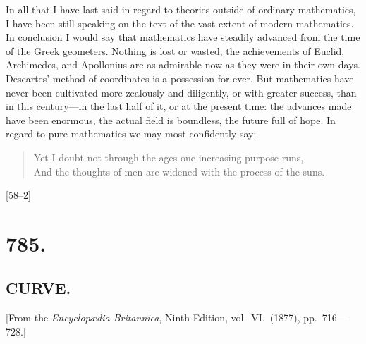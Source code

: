 \documentclass[12pt,a4paper,oneside]{book}
\newcommand{\paperref}[1]{\par\noindent\hfill[#1]\hfill\null\par}
\begin{document}
In all that I have last said in regard to theories outside of ordinary mathematics, I have been still speaking on the text of the vast extent of modern mathematics. In conclusion I would say that mathematics have steadily advanced from the time of the Greek geometers. Nothing is lost or wasted; the achievements of Euclid, Archimedes, and Apollonius are as admirable now as they were in their own days. Descartes' method of coordinates is a possession for ever. But mathematics have never been cultivated more zealously and diligently, or with greater success, than in this century---in the last half of it, or at the present time: the advances made have been enormous, the actual field is boundless, the future full of hope. In regard to pure mathematics we may most confidently say:

\begin{quote}
Yet I doubt not through the ages one increasing purpose runs,\\
And the thoughts of men are widened with the process of the suns.
\end{quote}

\paperref{58--2}
\newpage


\vspace{2em}
\noindent\dotfill
\vspace{1em}

\section*{785.}
\subsection*{CURVE.}

\begin{center}
\small [From the \textit{Encyclop\ae dia Britannica}, Ninth Edition, vol.~VI.\ (1877), pp.~716---728.]
\end{center}

\medskip
\end{document}
